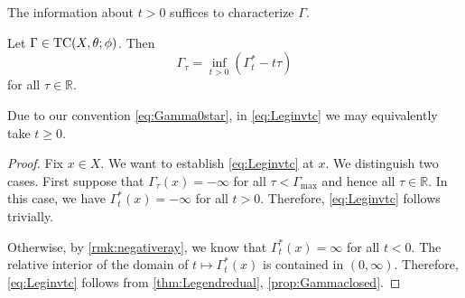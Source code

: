 The information about $t>0$ suffices to characterize $\Gamma$.
\begin{proposition}\label{prop:Leginvtc}
    Let $\Gamma\in \mathrm{TC}(X,\theta;\phi)$. Then
    \begin{equation}\label{eq:Leginvtc}
    \Gamma_{\tau}=\inf_{t>0} \left(\Gamma^*_t-t\tau\right)
    \end{equation}
    for all $\tau\in \mathbb{R}$.
\end{proposition}
Due to our convention \eqref{eq:Gamma0star}, in \eqref{eq:Leginvtc} we may equivalently take $t\geq 0$.
\begin{proof}
    Fix $x\in X$. We want to establish \eqref{eq:Leginvtc} at $x$.
    We distinguish two cases. First suppose that $\Gamma_{\tau}(x)=-\infty$ for all $\tau<\Gamma_{\max}$ and hence all $\tau\in \mathbb{R}$. In this case, we have $\Gamma_t^*(x)=-\infty$ for all $t>0$. Therefore, \eqref{eq:Leginvtc} follows trivially.

    Otherwise, by \cref{rmk:negativeray}, we know that $\Gamma^*_t(x)=\infty$ for all $t<0$. The relative interior of the domain of $t\mapsto \Gamma^*_t(x)$ is contained in $(0,\infty)$.
    Therefore, \eqref{eq:Leginvtc} follows from \cref{thm:Legendredual}, \cref{prop:Gammaclosed}.
\end{proof}

